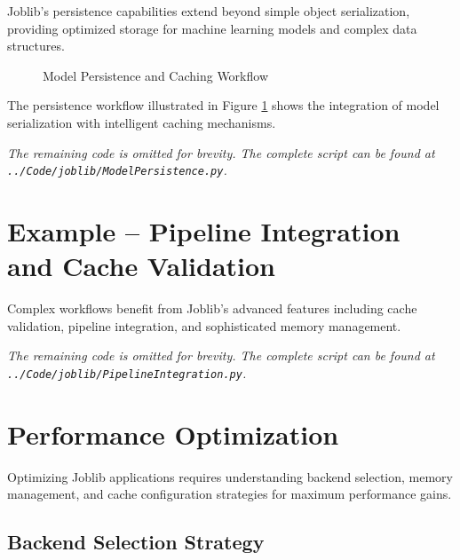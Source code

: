 Joblib's persistence capabilities extend beyond simple object serialization, providing optimized storage for machine learning models and complex data structures.

\begin{figure}[htbp]
	\centering
    
	\caption{Model Persistence and Caching Workflow}
	\label{fig:persistence_flow}
\end{figure}

The persistence workflow illustrated in Figure \ref{fig:persistence_flow} shows the integration of model serialization with intelligent caching mechanisms.


\noindent\textit{The remaining code is omitted for brevity. The complete script can be found at \texttt{../Code/joblib/ModelPersistence.py}.}

\section{Example -- Pipeline Integration and Cache Validation}
\label{sec:pipeline_example}

Complex workflows benefit from Joblib's advanced features including cache validation, pipeline integration, and sophisticated memory management.


\noindent\textit{The remaining code is omitted for brevity. The complete script can be found at \texttt{../Code/joblib/PipelineIntegration.py}.}

\section{Performance Optimization}
\label{sec:optimization}

Optimizing Joblib applications requires understanding backend selection, memory management, and cache configuration strategies for maximum performance gains.

\subsection{Backend Selection Strategy}
\label{subsec:backend_selection}

